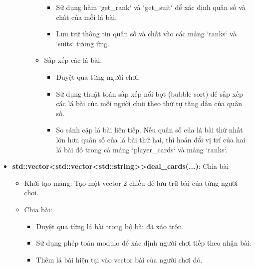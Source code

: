 \documentclass{article}
\begin{document}
\begin{itemize}
\begin{description}
\begin{itemize}
\begin{itemize}
                    \item Sử dụng hàm `get\_rank` và `get\_suit` để xác định quân số và chất của mỗi lá bài.
                    \item Lưu trữ thông tin quân số và chất vào các mảng `ranks` và `suits` tương ứng.
                \end{itemize}
            \item Sắp xếp các lá bài:
                \begin{itemize}
                    \item Duyệt qua từng người chơi.
                    \item Sử dụng thuật toán sắp xếp nổi bọt (bubble sort) để sắp xếp các lá bài của mỗi người chơi theo thứ tự tăng dần của quân số.
                    \item So sánh cặp lá bài liên tiếp. Nếu quân số của lá bài thứ nhất lớn hơn quân số của lá bài thứ hai, thì hoán đổi vị trí của hai lá bài đó trong cả mảng `player\_cards` và mảng `ranks`.
                \end{itemize}
        \end{itemize}
\end{description}

    \item \textbf{std::vector<std::vector<std::string>>deal\_cards(...)}: Chia bài
    \begin{description}
        \begin{itemize}
            \item Khởi tạo mảng: Tạo một vector 2 chiều để lưu trữ bài của từng người chơi.
            \item Chia bài:
                \begin{itemize}
                    \item Duyệt qua từng lá bài trong bộ bài đã xáo trộn.
                    \item Sử dụng phép toán modulo để xác định người chơi tiếp theo nhận bài.
                    \item Thêm lá bài hiện tại vào vector bài của người chơi đó.
                \end{itemize}
        \end{itemize}
    \end{description}
    

\end{itemize}
\end{document}
